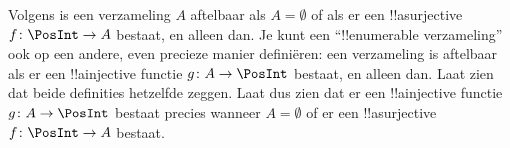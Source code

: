 \documentclass[../../../include/open-logic-section]{subfiles}
\begin{document}
\begin{prob}
  Volgens  is een verzameling $A$
  aftelbaar als $A = \emptyset$ of als er een !!a{surjective}
  $f\colon \PosInt \to A$ bestaat, en alleen dan. Je kunt een
  ``!!{enumerable} verzameling'' ook op een andere, even precieze manier definiëren: een
  verzameling is aftelbaar als er een !!a{injective} functie
  $g\colon A \to \PosInt$ bestaat, en alleen dan. Laat zien dat beide
  definities hetzelfde zeggen. Laat dus zien dat er een !!a{injective}
  functie $g\colon A \to \PosInt$ bestaat precies wanneer
  $A = \emptyset$ of er een !!a{surjective} $f\colon \PosInt \to A$
  bestaat.
\end{prob}
\end{document}
